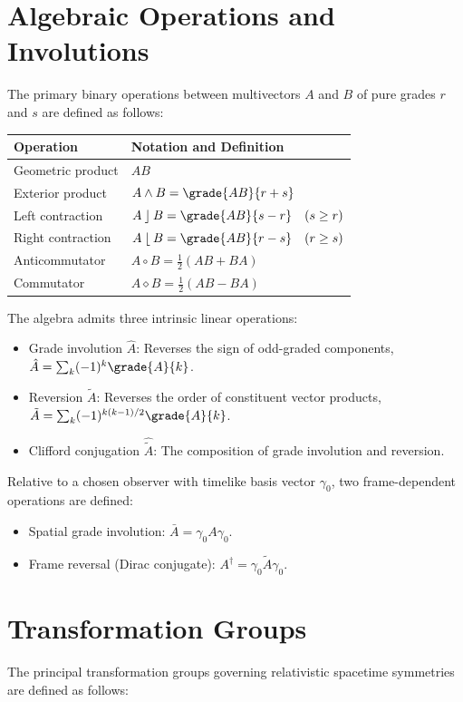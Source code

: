 \section*{Algebraic Operations and Involutions}
The primary binary operations between multivectors $A$ and $B$ of pure grades
$r$ and $s$ are defined as follows:

\begin{table}[H]
  \centering
  \begin{tabular}{ll}
    \toprule
    Operation & Notation and Definition \\
    \midrule
    Geometric product & $A B$ \\
    Exterior product & $A \wedge B = \grade{AB}{r+s}$ \\
    Left contraction & $A \lc B = \grade{AB}{s-r} \quad (s \ge r)$ \\
    Right contraction & $A \rc B = \grade{AB}{r-s} \quad (r \ge s)$ \\
    Anticommutator & $A \circ B = \frac{1}{2}(AB + BA)$ \\
    Commutator & $A \diamond B = \frac{1}{2}(AB - BA)$ \\
    \bottomrule
  \end{tabular}
\end{table}

The algebra admits three intrinsic linear operations:
\begin{itemize}
  \item Grade involution $\hat{A}$: Reverses the sign of odd-graded components,
    $\hat{A} = \sum_k (-1)^k \grade{A}{k}$.
  \item Reversion $\tilde{A}$: Reverses the order of constituent vector products,
    $\tilde{A} = \sum_k (-1)^{k(k-1)/2} \grade{A}{k}$.
  \item Clifford conjugation $\hat{\tilde{A}}$: The composition of grade
    involution and reversion.
\end{itemize}

Relative to a chosen observer with timelike basis vector $\gamma_0$, two
frame-dependent operations are defined:
\begin{itemize}
  \item Spatial grade involution: $\bar{A} = \gamma_0 A \gamma_0$.
  \item Frame reversal (Dirac conjugate): $A^\dagger = \gamma_0 \tilde{A}
    \gamma_0$.
\end{itemize}

\section*{Transformation Groups}
The principal transformation groups governing relativistic spacetime symmetries
are defined as follows:

